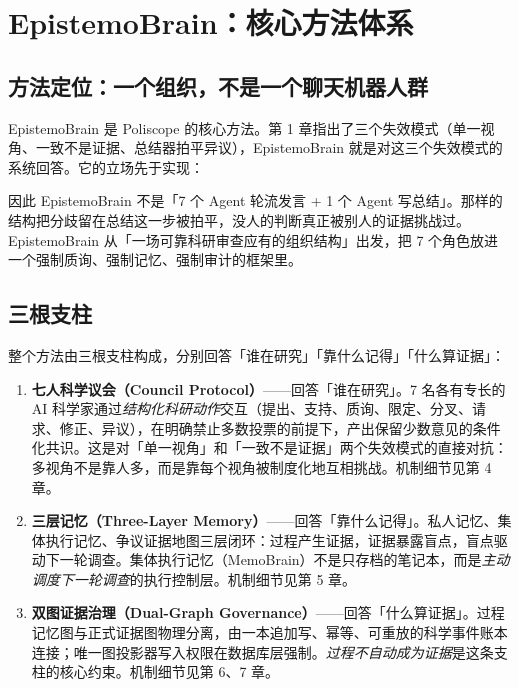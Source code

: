 \section{EpistemoBrain：核心方法体系}

\subsection{方法定位：一个组织，不是一个聊天机器人群}

EpistemoBrain 是 Poliscope 的核心方法。第 1 章指出了三个失效模式（单一视角、一致不是证据、总结器拍平异议），EpistemoBrain 就是对这三个失效模式的系统回答。它的立场先于实现：

\begin{center}
\end{center}

因此 EpistemoBrain 不是「7 个 Agent 轮流发言 + 1 个 Agent 写总结」。那样的结构把分歧留在总结这一步被拍平，没人的判断真正被别人的证据挑战过。EpistemoBrain 从「一场可靠科研审查应有的组织结构」出发，把 7 个角色放进一个强制质询、强制记忆、强制审计的框架里。

\subsection{三根支柱}

整个方法由三根支柱构成，分别回答「谁在研究」「靠什么记得」「什么算证据」：

\begin{enumerate}
\item \textbf{七人科学议会（Council Protocol）}——回答「谁在研究」。7 名各有专长的 AI 科学家通过\emph{结构化科研动作}交互（提出、支持、质询、限定、分叉、请求、修正、异议），在明确禁止多数投票的前提下，产出保留少数意见的条件化共识。这是对「单一视角」和「一致不是证据」两个失效模式的直接对抗：多视角不是靠人多，而是靠每个视角被制度化地互相挑战。机制细节见第 4 章。
\item \textbf{三层记忆（Three-Layer Memory）}——回答「靠什么记得」。私人记忆、集体执行记忆、争议证据地图三层闭环：过程产生证据，证据暴露盲点，盲点驱动下一轮调查。集体执行记忆（MemoBrain）不是只存档的笔记本，而是\emph{主动调度下一轮调查}的执行控制层。机制细节见第 5 章。
\item \textbf{双图证据治理（Dual-Graph Governance）}——回答「什么算证据」。过程记忆图与正式证据图物理分离，由一本追加写、幂等、可重放的科学事件账本连接；唯一图投影器写入权限在数据库层强制。\emph{过程不自动成为证据}是这条支柱的核心约束。机制细节见第 6、7 章。
\end{enumerate}

